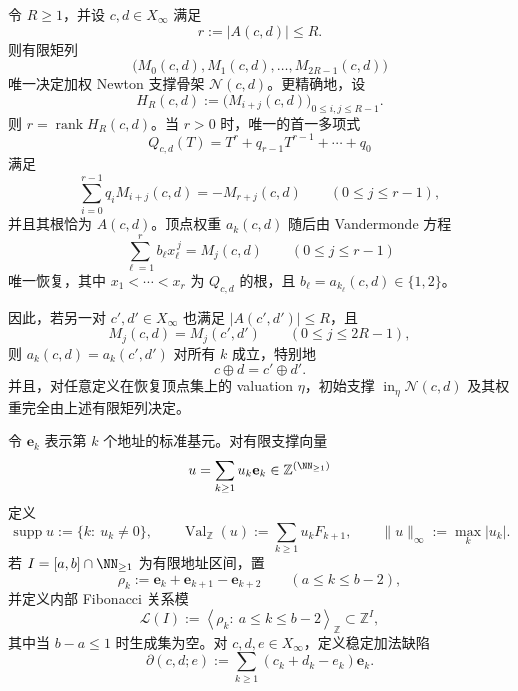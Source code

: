 \begin{theorem}\label{distill:khovanskii_newton_polyhedra_fewnomials_and_tropical_skeletons-support_to_skeleton_reduction-mixed-moment-newton-skeleton-rigidity}
令 \(R\ge1\)，并设 \(c,d\in X_\infty\) 满足
\[
 r:=|A(c,d)|\le R.
\]
则有限矩列
\[
 \bigl(M_0(c,d),M_1(c,d),\ldots,M_{2R-1}(c,d)\bigr)
\]
唯一决定加权 Newton 支撑骨架 \(\mathcal N(c,d)\)。更精确地，设
\[
 H_R(c,d):=\bigl(M_{i+j}(c,d)\bigr)_{0\le i,j\le R-1}.
\]
则 \(r=\operatorname{rank}H_R(c,d)\)。当 \(r>0\) 时，唯一的首一多项式
\[
 Q_{c,d}(T)=T^r+q_{r-1}T^{r-1}+\cdots+q_0
\]
满足
\[
 \sum_{i=0}^{r-1}q_iM_{i+j}(c,d)=-M_{r+j}(c,d)\qquad(0\le j\le r-1),
\]
并且其根恰为 \(A(c,d)\)。顶点权重 \(a_k(c,d)\) 随后由 Vandermonde 方程
\[
 \sum_{\ell=1}^r b_\ell x_\ell^{\,j}=M_j(c,d)\qquad(0\le j\le r-1)
\]
唯一恢复，其中 \(x_1<\cdots<x_r\) 为 \(Q_{c,d}\) 的根，且 \(b_\ell=a_{k_\ell}(c,d)\in\{1,2\}\)。

因此，若另一对 \(c',d'\in X_\infty\) 也满足 \(|A(c',d')|\le R\)，且
\[
 M_j(c,d)=M_j(c',d')\qquad(0\le j\le 2R-1),
\]
则 \(a_k(c,d)=a_k(c',d')\) 对所有 \(k\) 成立，特别地
\[
 c\oplus d=c'\oplus d'.
\]
并且，对任意定义在恢复顶点集上的 valuation \(\eta\)，初始支撑 \(\operatorname{in}_\eta\mathcal N(c,d)\) 及其权重完全由上述有限矩列决定。
\end{theorem}
\begin{definition}\label{distill:khovanskii_newton_polyhedra_fewnomials_and_tropical_skeletons-fewnomial_budget_bounds-finite-active-address-certificate}
令 \(\mathbf e_k\) 表示第 \(k\) 个地址的标准基元。对有限支撑向量
\[
 u=\sum_{k\ge1}u_k\mathbf e_k\in \mathbb Z^{(\NN_{\ge1})}
\]
定义
\[
 \operatorname{supp}u:=\{k:\ u_k\ne0\},\qquad
 \operatorname{Val}_{\mathbb Z}(u):=\sum_{k\ge1}u_kF_{k+1},\qquad
 \|u\|_\infty:=\max_k |u_k|.
\]
若 \(I=[a,b]\cap\NN_{\ge1}\) 为有限地址区间，置
\[
 \rho_k:=\mathbf e_k+\mathbf e_{k+1}-\mathbf e_{k+2}\qquad(a\le k\le b-2),
\]
并定义内部 Fibonacci 关系模
\[
 \mathcal L(I):=\left\langle \rho_k:\ a\le k\le b-2\right\rangle_{\mathbb Z}\subset \mathbb Z^I,
\]
其中当 \(b-a\le1\) 时生成集为空。对 \(c,d,e\in X_\infty\)，定义稳定加法缺陷
\[
 \partial(c,d;e):=\sum_{k\ge1}(c_k+d_k-e_k)\mathbf e_k.
\]
\end{definition}

